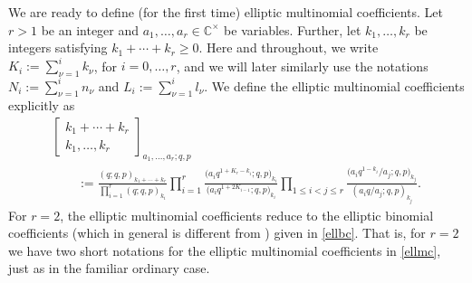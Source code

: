 \documentclass[pdftex]{sigma}
\numberwithin{equation}{section}
\theoremstyle{definition}
\newcommand{\C}{\mathbb C}
\begin{document}
We are ready to define (for the first time)
elliptic multinomial coefficients.
Let $r>1$ be an integer and $a_1,\dots,a_r\in\C^\times$ be variables.
Further, let $k_1,\dots,k_r$ be integers satisfying $k_1+\cdots+k_r\ge 0$.
Here and throughout, we write $K_i:=\sum_{\nu=1}^i k_\nu$,
for $i=0,\dots,r$, and we will later similarly use the notations
$N_i:=\sum_{\nu=1}^i n_\nu$ and $L_i:=\sum_{\nu=1}^i l_\nu$.
We define the elliptic multinomial coefficients explicitly as
\begin{gather}
\begin{bmatrix}k_1+\cdots+k_r\\k_1,\dots,k_r\end{bmatrix}
_{a_1,\dots,a_r;q,p}\nonumber\\
\qquad:=
\frac{(q;q,p)_{k_1+\cdots+k_r}}{\prod_{i=1}^r(q;q,p)_{k_i}}
\prod_{i=1}^r\frac{\bigl(a_iq^{1+K_r-k_i};q,p\bigr)_{k_i}}
{\bigl(a_iq^{1+2K_{i-1}};q,p\bigr)_{k_i}}
\prod_{1\le i<j\le r}\frac{\bigl(a_iq^{1-k_i}/a_j;q,p\bigr)_{k_j}}
{(a_iq/a_j;q,p)_{k_j}}.\label{ellmc}
\end{gather}
For $r=2$, the elliptic multinomial coefficients
reduce to the elliptic binomial coefficients
(which in general is different from
)
given in \eqref{ellbc}. That is, for $r=2$ we have two short notations for the
elliptic multinomial coefficients in \eqref{ellmc},
just as in the familiar ordinary case.
\end{document}
